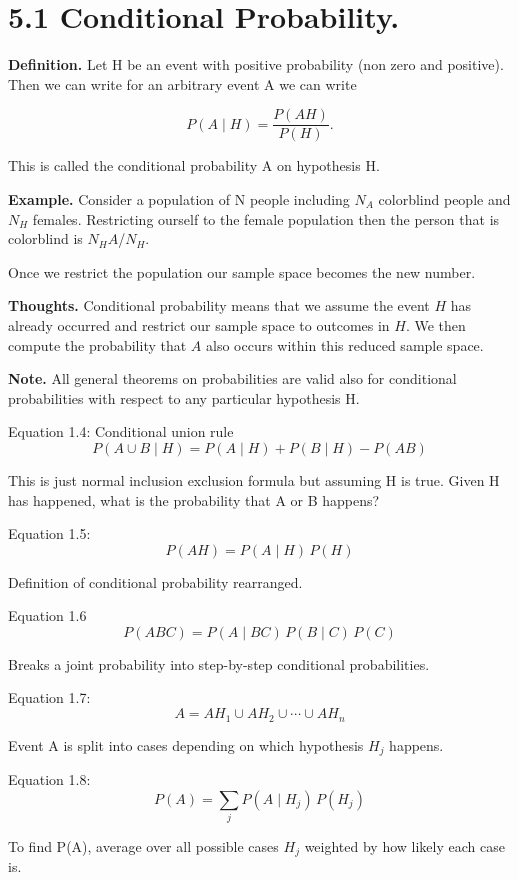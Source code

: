 \documentclass[12pt]{article}
\begin{document}
\section*{5.1 Conditional Probability.}
\textbf{Definition.}
Let H be an event with positive probability (non zero and positive). Then we can write for an arbitrary event A we can write 

\begin{equation}
P(A \mid H)=\frac{P(AH)}{P(H)}.
\end{equation}

This is called the conditional probability A on hypothesis H. 

\textbf{Example.}
Consider a population of N people including $N_A$ colorblind people and $N_H$ females. Restricting ourself to the female population then the person that is colorblind is $N_HA$/$N_H$. 

Once we restrict the population our sample space becomes the new number. 

\textbf{Thoughts.}
Conditional probability means that we assume the event \(H\) has already
occurred and restrict our sample space to outcomes in \(H\). We then
compute the probability that \(A\) also occurs within this reduced sample
space.

\textbf{Note.} All general theorems on probabilities are valid also for conditional probabilities with respect to any particular hypothesis H. 

Equation 1.4: Conditional union rule
\[P(A \cup B \mid H) = P(A \mid H) + P(B \mid H) - P(AB)\]

This is just normal inclusion exclusion formula but assuming H is true. Given H has happened, what is the probability that A or B happens?

Equation 1.5: 
\[P(AH) = P(A \mid H)\,P(H)\]

Definition of conditional probability rearranged.

Equation 1.6
\[P(ABC) = P(A \mid BC)\,P(B \mid C)\,P(C)\]

Breaks a joint probability into step-by-step conditional probabilities.


Equation 1.7: 
\[A = AH_1 \cup AH_2 \cup \cdots \cup AH_n\]

Event A is split into cases depending on which hypothesis $H_j$ happens.

Equation 1.8:
\[P(A) = \sum_j P(A \mid H_j)\,P(H_j)\]

To find P(A), average over all possible cases $H_j$ weighted by how likely each case is.
\end{document}
